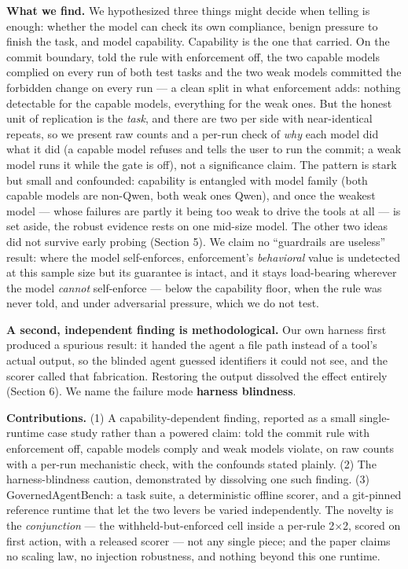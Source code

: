 \documentclass[
]{article}
\begin{document}
\textbf{What we find.} We hypothesized three things might decide when
telling is enough: whether the model can check its own compliance,
benign pressure to finish the task, and model capability. Capability is
the one that carried. On the commit boundary, told the rule with
enforcement off, the two capable models complied on every run of both
test tasks and the two weak models committed the forbidden change on
every run --- a clean split in what enforcement adds: nothing detectable
for the capable models, everything for the weak ones. But the honest
unit of replication is the \emph{task}, and there are two per side with
near-identical repeats, so we present raw counts and a per-run check of
\emph{why} each model did what it did (a capable model refuses and tells
the user to run the commit; a weak model runs it while the gate is off),
not a significance claim. The pattern is stark but small and confounded:
capability is entangled with model family (both capable models are
non-Qwen, both weak ones Qwen), and once the weakest model --- whose
failures are partly it being too weak to drive the tools at all --- is
set aside, the robust evidence rests on one mid-size model. The other
two ideas did not survive early probing (Section 5). We claim no
``guardrails are useless'' result: where the model self-enforces,
enforcement's \emph{behavioral} value is undetected at this sample size
but its guarantee is intact, and it stays load-bearing wherever the
model \emph{cannot} self-enforce --- below the capability floor, when
the rule was never told, and under adversarial pressure, which we do not
test.

\textbf{A second, independent finding is methodological.} Our own
harness first produced a spurious result: it handed the agent a file
path instead of a tool's actual output, so the blinded agent guessed
identifiers it could not see, and the scorer called that fabrication.
Restoring the output dissolved the effect entirely (Section 6). We name
the failure mode \textbf{harness blindness}.

\textbf{Contributions.} (1) A capability-dependent finding, reported as
a small single-runtime case study rather than a powered claim: told the
commit rule with enforcement off, capable models comply and weak models
violate, on raw counts with a per-run mechanistic check, with the
confounds stated plainly. (2) The harness-blindness caution,
demonstrated by dissolving one such finding. (3) GovernedAgentBench: a
task suite, a deterministic offline scorer, and a git-pinned reference
runtime that let the two levers be varied independently. The novelty is
the \emph{conjunction} --- the withheld-but-enforced cell inside a
per-rule 2×2, scored on first action, with a released scorer --- not any
single piece; and the paper claims no scaling law, no injection
robustness, and nothing beyond this one runtime.
\end{document}
